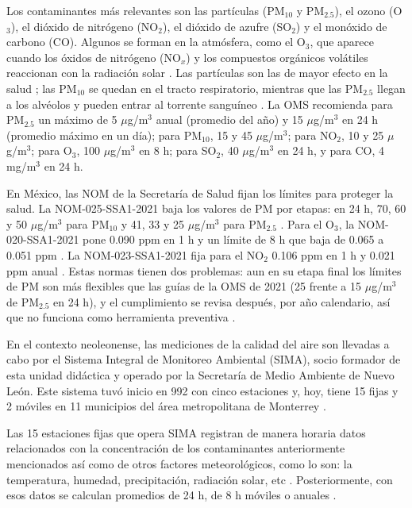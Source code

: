 \documentclass[11pt]{article}
\begin{document}
Los contaminantes más relevantes son las partículas (PM$_{10}$ y PM$_{2.5}$), el ozono (O$_3$), el dióxido de nitrógeno (NO$_2$), el dióxido de azufre (SO$_2$) y el monóxido de carbono (CO). Algunos se forman en la atmósfera, como el O$_3$, que aparece cuando los óxidos de nitrógeno (NO$_x$) y los compuestos orgánicos volátiles reaccionan con la radiación solar \citep{ssa2021b}. Las partículas son las de mayor efecto en la salud \citep{montero2011}; las PM$_{10}$ se quedan en el tracto respiratorio, mientras que las PM$_{2.5}$ llegan a los alvéolos y pueden entrar al torrente sanguíneo \citep{ssa2021a}. La OMS \citeyearpar{oms2021} recomienda para PM$_{2.5}$ un máximo de 5 $\mu$g/m$^3$ anual (promedio del año) y 15 $\mu$g/m$^3$ en 24 h (promedio máximo en un día); para PM$_{10}$, 15 y 45 $\mu$g/m$^3$; para NO$_2$, 10 y 25 $\mu$g/m$^3$; para O$_3$, 100 $\mu$g/m$^3$ en 8 h; para SO$_2$, 40 $\mu$g/m$^3$ en 24 h, y para CO, 4 mg/m$^3$ en 24 h. 

En México, las NOM de la Secretaría de Salud fijan los límites para proteger la salud. La NOM-025-SSA1-2021 baja los valores de PM por etapas: en 24 h, 70, 60 y 50 $\mu$g/m$^3$ para PM$_{10}$ y 41, 33 y 25 $\mu$g/m$^3$ para PM$_{2.5}$ \citep{ssa2021a}. Para el O$_3$, la NOM-020-SSA1-2021 pone 0.090 ppm en 1 h y un límite de 8 h que baja de 0.065 a 0.051 ppm \citep{ssa2021b}. La NOM-023-SSA1-2021 fija para el NO$_2$ 0.106 ppm en 1 h y 0.021 ppm anual \citep{ssa2021c}. Estas normas tienen dos problemas: aun en su etapa final los límites de PM son más flexibles que las guías de la OMS de 2021 (25 frente a 15 $\mu$g/m$^3$ de PM$_{2.5}$ en 24 h), y el cumplimiento se revisa después, por año calendario, así que no funciona como herramienta preventiva \citep{ssa2021a}.

En el contexto neoleonense, las mediciones de la calidad del aire son llevadas a cabo por el Sistema Integral de Monitoreo Ambiental (SIMA), socio formador de esta unidad didáctica y operado por la Secretaría de Medio Ambiente de Nuevo León. Este sistema tuvó inicio en 992 con cinco estaciones y, hoy, tiene 15 fijas y 2 móviles en 11 municipios del área metropolitana de Monterrey \citep{mvs2026}.

Las 15 estaciones fijas que opera SIMA registran de manera horaria datos relacionados con la concentración de los contaminantes anteriormente mencionados así como de otros factores meteorológicos, como lo son: la temperatura, humedad, precipitación, radiación solar, etc \citep{simapresentacion}. Posteriormente, con esos datos se calculan promedios de 24 h, de 8 h móviles o anuales \citep{ssa2021a}.
\end{document}
